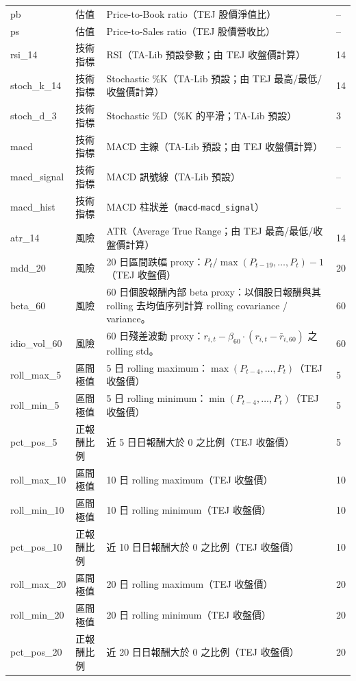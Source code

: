 \begin{longtable}{p{3.1cm} p{2.6cm} p{7.4cm} p{1.6cm}}
pb & 估值 & Price-to-Book ratio（TEJ 股價淨值比） & -- \\
ps & 估值 & Price-to-Sales ratio（TEJ 股價營收比） & -- \\

rsi\_14 & 技術指標 & RSI（TA-Lib 預設參數；由 TEJ 收盤價計算） & 14 \\
stoch\_k\_14 & 技術指標 & Stochastic \%K（TA-Lib 預設；由 TEJ 最高/最低/收盤價計算） & 14 \\
stoch\_d\_3  & 技術指標 & Stochastic \%D（\%K 的平滑；TA-Lib 預設） & 3 \\
macd & 技術指標 & MACD 主線（TA-Lib 預設；由 TEJ 收盤價計算） & -- \\
macd\_signal & 技術指標 & MACD 訊號線（TA-Lib 預設） & -- \\
macd\_hist & 技術指標 & MACD 柱狀差（\texttt{macd}-\texttt{macd\_signal}） & -- \\

atr\_14 & 風險 & ATR（Average True Range；由 TEJ 最高/最低/收盤價計算） & 14 \\
mdd\_20 & 風險 & 20 日區間跌幅 proxy：$P_t/\max(P_{t-19},\ldots,P_t)-1$（TEJ 收盤價） & 20 \\

beta\_60 & 風險 & 60 日個股報酬內部 beta proxy：以個股日報酬與其 rolling 去均值序列計算 rolling covariance / variance。 & 60 \\
idio\_vol\_60 & 風險 & 60 日殘差波動 proxy：$r_{i,t}-\beta_{60}\cdot(r_{i,t}-\bar r_{i,60})$ 之 rolling std。 & 60 \\

roll\_max\_5  & 區間極值 & 5 日 rolling maximum：$\max(P_{t-4},\ldots,P_t)$（TEJ 收盤價） & 5 \\
roll\_min\_5  & 區間極值 & 5 日 rolling minimum：$\min(P_{t-4},\ldots,P_t)$（TEJ 收盤價） & 5 \\
pct\_pos\_5   & 正報酬比例 & 近 5 日日報酬大於 0 之比例（TEJ 收盤價） & 5 \\

roll\_max\_10 & 區間極值 & 10 日 rolling maximum（TEJ 收盤價） & 10 \\
roll\_min\_10 & 區間極值 & 10 日 rolling minimum（TEJ 收盤價） & 10 \\
pct\_pos\_10  & 正報酬比例 & 近 10 日日報酬大於 0 之比例（TEJ 收盤價） & 10 \\

roll\_max\_20 & 區間極值 & 20 日 rolling maximum（TEJ 收盤價） & 20 \\
roll\_min\_20 & 區間極值 & 20 日 rolling minimum（TEJ 收盤價） & 20 \\
pct\_pos\_20  & 正報酬比例 & 近 20 日日報酬大於 0 之比例（TEJ 收盤價） & 20 \\


\end{longtable}
